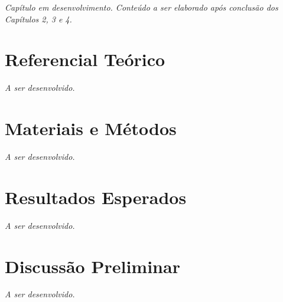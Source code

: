 

\textit{Capítulo em desenvolvimento. Conteúdo a ser elaborado após conclusão dos Capítulos 2, 3 e 4.}


\section{Referencial Teórico}

\textit{A ser desenvolvido.}


\section{Materiais e Métodos}

\textit{A ser desenvolvido.}


\section{Resultados Esperados}

\textit{A ser desenvolvido.}


\section{Discussão Preliminar}

\textit{A ser desenvolvido.}
